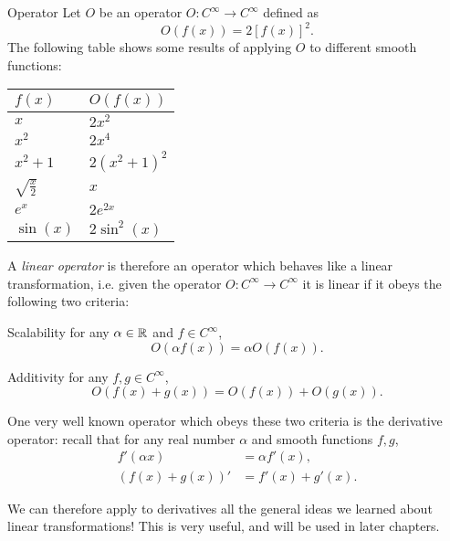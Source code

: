 \begin{example}{Operator}{}
	Let $O$ be an operator $O:C^{\infty}\to C^{\infty}$ defined as
	\[
		O \left( f(x) \right) = 2\left[f(x)\right]^{2}.
	\]
	The following table shows some results of applying $O$ to different smooth functions:
	\begin{center}
		{\renewcommand*{\arraystretch}{1.5}
		\begin{tabular}{ll}
			\toprule
			$f(x)$ & $O \left( f(x) \right)$\\
			\midrule
			$x$ & $2x^{2}$\\
			$x^{2}$ & $2x^{4}$\\
			$x^{2}+1$ & $2 \left( x^{2}+1 \right)^{2}$\\
			$\sqrt{\frac{x}{2}}$ & $x$\\
			$e^{x}$ & $2e^{2x}$\\
			$\sin(x)$ & $2\sin^{2}(x)$\\
			\bottomrule
		\end{tabular}
	}
	\end{center}
\end{example}

A \emph{linear operator} is therefore an operator which behaves like a linear transformation, i.e. given the operator $O:C^{\infty}\to C^{\infty}$ it is linear if it obeys the following two criteria:
\begin{descitemize}
	\item[Scalability] for any $\alpha\in\mathbb{R}^{}$ and $f\in C^{\infty}$,
		\[
			O \left( \alpha f(x) \right) = \alpha O \left( f(x) \right).
		\]
	\item[Additivity] for any $f,g\in C^{\infty}$,
		\[
			O \left( f(x)+g(x) \right) = O \left( f(x) \right) + O \left( g(x) \right).
		\]
\end{descitemize}

One very well known operator which obeys these two criteria is the derivative operator: recall that for any real number $\alpha$ and smooth functions $f,g$,
\begin{align}
	f' \left( \alpha x \right) &= \alpha f'(x)\nonumber,\\
	\left( f(x)+g(x) \right)' &= f'(x) + g'(x).
	\label{eq:derivative_as_linear_opeator}
\end{align}

We can therefore apply to derivatives all the general ideas we learned about linear transformations! This is very useful, and will be used in later chapters.

